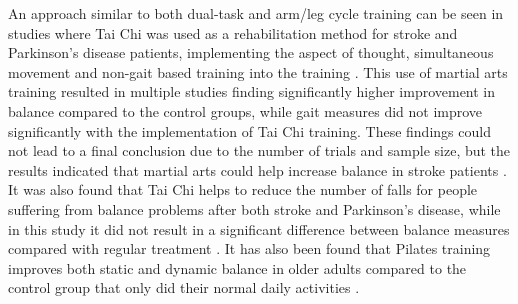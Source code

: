 An approach similar to both dual-task and arm/leg cycle training can be seen in studies where Tai Chi was used as a rehabilitation method for stroke and Parkinson's disease patients, implementing the aspect of thought, simultaneous movement and non-gait based training into the training \cite{Ding2012,Winser2018}. This use of martial arts training resulted in multiple studies finding significantly higher improvement in balance compared to the control groups, while gait measures did not improve significantly with the implementation of Tai Chi training. \cite{Ding2012}
These findings could not lead to a final conclusion due to the number of trials and sample size, but the results indicated that martial arts could help increase balance in stroke patients \cite{Ding2012}. It was also found that Tai Chi helps to reduce the number of falls for people suffering from balance problems after both stroke and Parkinson's disease, while in this study it did not result in a significant difference between balance measures compared with regular treatment \cite{Winser2018}. It has also been found that Pilates training improves both static and dynamic balance in older adults compared to the control group that only did their normal daily activities \cite{Moreno2017}.